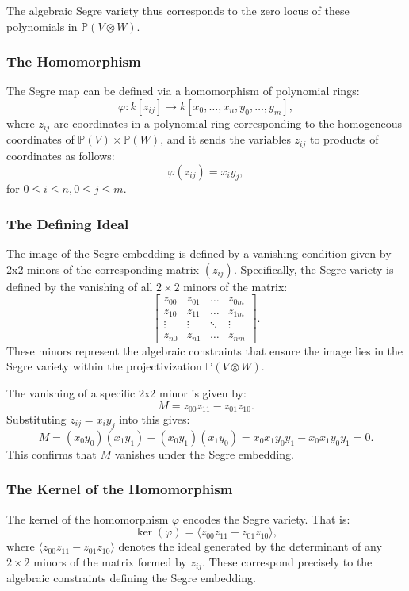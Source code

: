 The algebraic Segre variety thus corresponds to the zero locus of these polynomials in \( \mathbb{P}(V \otimes W) \).


\subsubsection*{The Homomorphism}

The Segre map can be defined via a homomorphism of polynomial rings:
\[
\varphi: k[z_{ij}] \to k[x_0, \dots, x_n, y_0, \dots, y_m],
\]
where \( z_{ij} \) are coordinates in a polynomial ring corresponding to the homogeneous coordinates of \( \mathbb{P}(V) \times \mathbb{P}(W) \), and it sends the variables \( z_{ij} \) to products of coordinates as follows:
\[
\varphi(z_{ij}) = x_i y_j,
\]
for \( 0 \le i \le n, 0 \le j \le m \).

\subsubsection*{The Defining Ideal}

The image of the Segre embedding is defined by a vanishing condition given by 2x2 minors of the corresponding matrix \( (z_{ij}) \). Specifically, the Segre variety is defined by the vanishing of all \( 2 \times 2 \) minors of the matrix: \[
\begin{bmatrix}
z_{00} & z_{01} & \dots & z_{0m} \\
z_{10} & z_{11} & \dots & z_{1m} \\
\vdots & \vdots & \ddots & \vdots \\
z_{n0} & z_{n1} & \dots & z_{nm}
\end{bmatrix}.
\]
These minors represent the algebraic constraints that ensure the image lies in the Segre variety within the projectivization \( \mathbb{P}(V \otimes W) \).

The vanishing of a specific 2x2 minor is given by:
\[
M = z_{00} z_{11} - z_{01} z_{10}.
\]
Substituting \( z_{ij} = x_i y_j \) into this gives:
\[
M = (x_0 y_0)(x_1 y_1) - (x_0 y_1)(x_1 y_0) = x_0 x_1 y_0 y_1 - x_0 x_1 y_0 y_1 = 0.
\]
This confirms that \( M \) vanishes under the Segre embedding.

\subsubsection*{The Kernel of the Homomorphism}

The kernel of the homomorphism \( \varphi \) encodes the Segre variety. That is:
\[
\ker(\varphi) = \langle z_{00} z_{11} - z_{01} z_{10} \rangle,
\]
where \( \langle z_{00} z_{11} - z_{01} z_{10} \rangle \) denotes the ideal generated by the determinant of any \( 2 \times 2 \) minors of the matrix formed by \( z_{ij} \). These correspond precisely to the algebraic constraints defining the Segre embedding.

